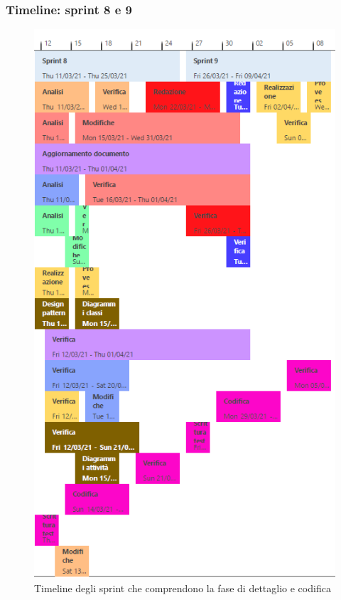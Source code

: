 \subsubsection{Timeline: sprint 8 e 9}

\begin{figure}[H]
    \centering
    \includegraphics[scale = 0.5]{components/img/sprint8-9.png}
    \caption{Timeline degli sprint che comprendono la  fase di dettaglio e codifica}
    \label{fig:Timeline,sprint 8 e 9, fase di dettaglio e codifica}
\end{figure}

